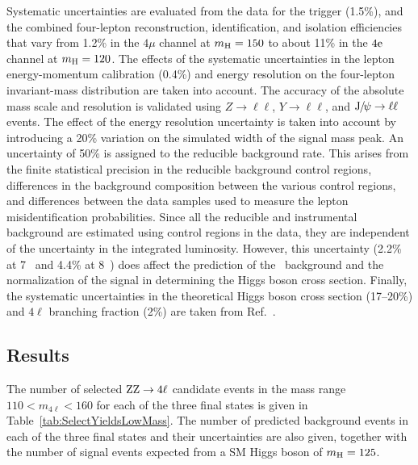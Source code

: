\documentclass[11pt,twoside,a4paper,cmspaper,final,collab]{cms-tdr}
\begin{document}
Systematic uncertainties are evaluated from the data for the trigger (1.5\%), and the combined four-lepton reconstruction,
identification, and isolation efficiencies that vary from 1.2\% in the $4\mu$ channel at $m_{\mathrm{H}}=150$\GeV
to about 11\% in the $4\mathrm{e}$ channel at  $m_{\mathrm{H}}=120$\GeV.
The effects of the systematic uncertainties in the lepton energy-momentum calibration  (0.4\%) and energy resolution
on the four-lepton invariant-mass distribution are taken into account.
The accuracy of the absolute mass scale and resolution is validated using
$Z \to \ell\ell$, $Y \to \ell\ell$, and  $\mathrm{J}\hspace{-.08em}/\hspace{-.14em}\psi \to \ell\ell$ events.
The effect of the energy resolution uncertainty is taken into account by introducing a 20\%
variation on the simulated width of the signal mass peak.
An uncertainty of  50\% is assigned to the reducible background rate.
This arises from the finite statistical precision in the reducible background
control regions,  differences in the background composition between the
various control regions,
and  differences between the data samples used to measure  the lepton
misidentification probabilities.
Since all the reducible and instrumental background  are estimated using control regions in the data,
they are independent of the uncertainty in the integrated luminosity.
However, this uncertainty (2.2\% at 7\TeV~\cite{CMS-PAS-SMP-12-008} and 4.4\% at 8\TeV~\cite{CMS:2012jza})
does affect the prediction of the \cPZ\cPZ\ background and the
normalization of the signal in determining the Higgs boson cross section.
Finally, the systematic uncertainties in the theoretical Higgs boson cross section (17--20\%) and $4\ell$
branching fraction (2\%) are taken from Ref.~\cite{LHCHiggsCrossSectionWorkingGroup:2011ti}.


\subsection{Results}

The number of selected $\mathrm{Z}\mathrm{Z}\rightarrow 4\ell$ candidate events in the mass range $110 < m_{4\ell} < 160$\GeV
for each of the three final states is given in Table~\ref{tab:SelectYieldsLowMass}.
The number of predicted background events  in each of the three final states and their uncertainties are also given,
together with the number of signal events expected from a SM Higgs boson
of $m_{\mathrm{H}} = 125$\GeV.
\end{document}
